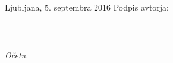 \vspace{1cm}
Ljubljana, 5. septembra 2016 \hspace{2.5cm} Podpis avtorja:
\newpage

\ \thispagestyle{empty}
\newpage

\thispagestyle{empty}

$\;$ 

\vspace{5cm}
\hfill {\Large \em Očetu.}
\thispagestyle{empty}

\vfill
\newpage

\newpage

\renewcommand\thepage{} 
\tableofcontents 
\renewcommand\thepage{\arabic{page}}
\thispagestyle{empty}


\newpage

\mbox{}
\thispagestyle{empty}
\newpage

\setcounter{page}{1}


\thispagestyle{empty}
\newpage


